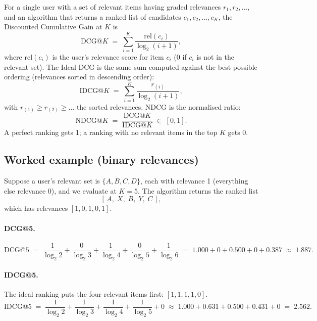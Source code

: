 \documentclass[11pt]{article}
\begin{document}
For a single user with a set of relevant items having graded relevances
$r_1, r_2, \dots$, and an algorithm that returns a ranked list of
candidates $c_1, c_2, \dots, c_K$, the Discounted Cumulative Gain at $K$
is
\begin{equation}
\mathrm{DCG@}K \;=\; \sum_{i=1}^{K} \frac{\mathrm{rel}(c_i)}{\log_2(i+1)},
\end{equation}
where $\mathrm{rel}(c_i)$ is the user's relevance score for item $c_i$
(0 if $c_i$ is not in the relevant set). The Ideal DCG is the same sum
computed against the best possible ordering (relevances sorted in
descending order):
\begin{equation}
\mathrm{IDCG@}K \;=\; \sum_{i=1}^{K} \frac{r_{(i)}}{\log_2(i+1)},
\end{equation}
with $r_{(1)} \geq r_{(2)} \geq \dots$ the sorted relevances. NDCG is the
normalised ratio:
\begin{equation}
\mathrm{NDCG@}K \;=\; \frac{\mathrm{DCG@}K}{\mathrm{IDCG@}K} \;\in\; [0, 1].
\end{equation}
A perfect ranking gets 1; a ranking with no relevant items in the top $K$
gets 0.

\subsection{Worked example (binary relevances)}

Suppose a user's relevant set is $\{A, B, C, D\}$, each with relevance 1
(everything else relevance 0), and we evaluate at $K = 5$. The algorithm
returns the ranked list
\[
[\, A,\; X,\; B,\; Y,\; C\, ],
\]
which has relevances $[1, 0, 1, 0, 1]$.

\paragraph{DCG@5.}
\[
\mathrm{DCG@}5 \;=\; \frac{1}{\log_2 2} + \frac{0}{\log_2 3} + \frac{1}{\log_2 4} + \frac{0}{\log_2 5} + \frac{1}{\log_2 6}
\;=\; 1.000 + 0 + 0.500 + 0 + 0.387 \;\approx\; 1.887.
\]

\paragraph{IDCG@5.}
The ideal ranking puts the four relevant items first:
$[1, 1, 1, 1, 0]$.
\[
\mathrm{IDCG@}5 \;=\; \frac{1}{\log_2 2} + \frac{1}{\log_2 3} + \frac{1}{\log_2 4} + \frac{1}{\log_2 5} + 0
\;\approx\; 1.000 + 0.631 + 0.500 + 0.431 + 0 \;=\; 2.562.
\]
\end{document}
